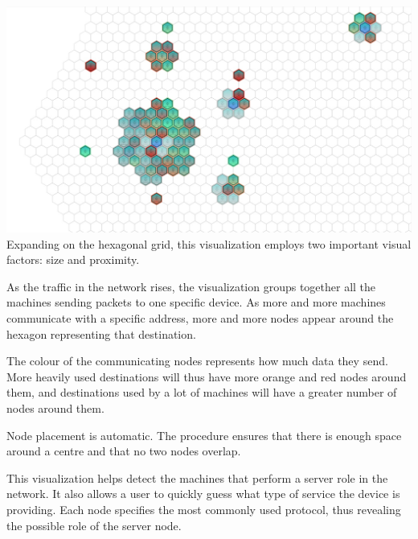 \includegraphics[width=\linewidth]{materials/groups.jpg}
Expanding on the hexagonal grid, this visualization employs two important visual factors:
size and proximity.

As the traffic in the network rises, the visualization groups together all the machines
sending packets to one specific device. As more and more machines communicate with a specific
address, more and more nodes appear around the hexagon representing that destination.

The colour of the communicating nodes represents how much data they send. More heavily used destinations 
will thus have more orange and red nodes around them, and destinations used by a lot of machines will have a greater number of nodes around them.

Node placement is automatic. The procedure ensures that there is enough space around a centre and that no two nodes overlap.

This visualization helps detect the machines that perform a server role in the network.
It also allows a user to quickly guess what type of service the device is providing. Each node specifies the
most commonly used protocol, thus revealing the possible role of the server node.